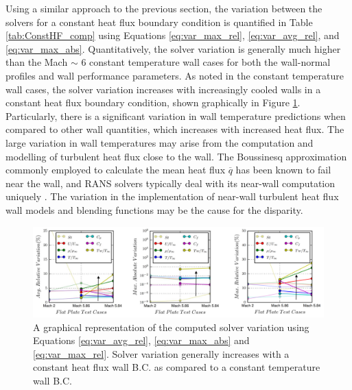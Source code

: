 \documentclass[journal ]{new-aiaa}
\begin{document}
Using a similar approach to the previous section, the variation between the solvers for a constant heat flux boundary condition is quantified in Table \ref{tab:ConstHF_comp} using Equations \ref{eq:var_max_rel}, \ref{eq:var_avg_rel}, and \ref{eq:var_max_abs}. Quantitatively, the solver variation is generally much higher than the Mach $\sim$ 6 constant temperature wall cases for both the wall-normal profiles and wall performance parameters. As noted in the constant temperature wall cases, the solver variation increases with increasingly cooled walls in a constant heat flux boundary condition, shown graphically in Figure \ref{fig:numericalquantification}. Particularly, there is a significant variation in wall temperature predictions when compared to other wall quantities, which increases with increased heat flux. The large variation in wall temperatures may arise from the computation and modelling of turbulent heat flux close to the wall. The Boussinesq approximation commonly employed to calculate the mean heat flux $\overline{q}$ has been known to fail near the wall, and RANS solvers typically deal with its near-wall computation uniquely \cite{SiemensPLM}. The variation in the implementation of near-wall turbulent heat flux wall models and blending functions may be the cause for the disparity. 

\begin{figure}
\centering
    \includegraphics[width=\textwidth]{CHT/Avg_Rel_Variation.png}
  \caption{A graphical representation of the computed solver variation using Equations \eqref{eq:var_avg_rel}, \eqref{eq:var_max_abs} and \eqref{eq:var_max_rel}. Solver variation generally increases with a constant heat flux wall B.C. as compared to a constant temperature wall B.C.}
  \label{fig:numericalquantification}
\end{figure}
\end{document}
